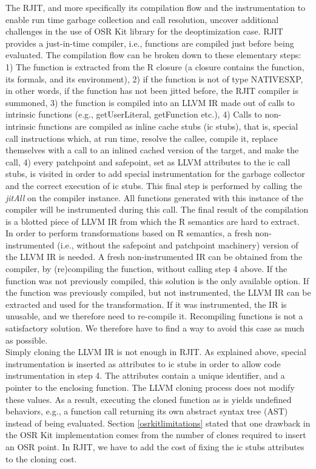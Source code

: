 The RJIT, and more specifically its compilation flow and the instrumentation to enable run time garbage collection and call resolution, uncover additional challenges in the use of OSR Kit\cite{OSRKit} library for the deoptimization case.
RJIT provides a just-in-time compiler, i.e., functions are compiled just before being evaluated.
The compilation flow can be broken down to these elementary steps: 1) The function is extracted from the R closure (a closure contains the function, its formals, and its environment), 2) if the function is not of type NATIVESXP, in other words, if the function has not been jitted before, the RJIT compiler is summoned, 3) the function is compiled into an LLVM IR made out of calls to intrinsic functions (e.g., getUserLiteral, getFunction etc.), 4) Calls to non-intrinsic functions are compiled as inline cache stubs (ic stubs), that is, special call instructions which, at run time, resolve the callee, compile it, replace themselves with a call to an inlined cached version of the target, and make the call, 4) every patchpoint and safepoint, set as LLVM attributes\cite{llvmAttribute} to the ic call stubs, is visited in order to add special instrumentation for the garbage collector and the correct execution of ic stubs.
This final step is performed by calling the \textit{jitAll} on the compiler instance.
All functions generated with this instance of the compiler will be instrumented during this call.
The final result of the compilation is a blotted piece of LLVM IR from which the R semantics are hard to extract.\\

In order to perform transformations based on R semantics, a fresh non-instrumented (i.e., without the safepoint and patchpoint machinery) version of the LLVM IR is needed.
A fresh non-instrumented IR can be obtained from the compiler, by (re)compiling the function, without calling step 4 above.
If the function was not previously compiled, this solution is the only available option.
If the function was previously compiled, but not instrumented, the LLVM IR can be extracted and used for the transformation.
If it was instrumented, the IR is unusable, and we therefore need to re-compile it.
Recompiling functions is not a satisfactory solution. 
We therefore have to find a way to avoid this case as much as possible.\\

Simply cloning the LLVM IR is not enough in RJIT.
As explained above, special instrumentation is inserted as attributes to ic stubs in order to allow code instrumentation in step 4.
The attributes contain a unique identifier, and a pointer to the enclosing function.
The LLVM cloning process does not modify these values. 
As a result, executing the cloned function as is yields undefined behaviors, e.g., a function call returning its own abstract syntax tree (AST) instead of being evaluated.
Section \ref{osrkitlimitations} stated that one drawback in the OSR Kit implementation comes from the number of clones required to insert an OSR point. 
In RJIT, we have to add the cost of fixing the ic stubs attributes to the cloning cost.\\

